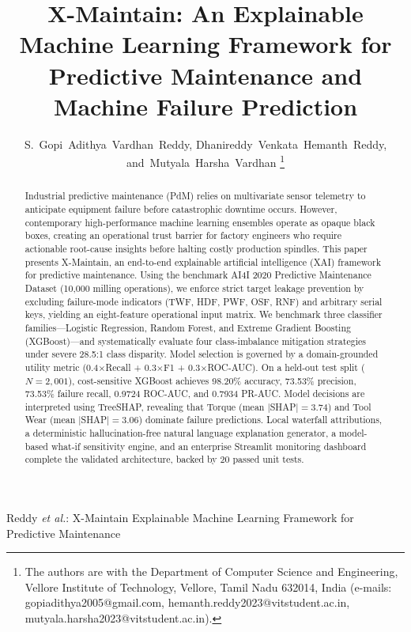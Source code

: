 \documentclass[journal,10pt,twocolumn]{IEEEtran}
\begin{document}
\title{X-Maintain: An Explainable Machine Learning Framework for Predictive Maintenance and Machine Failure Prediction}

\author{S.~Gopi~Adithya~Vardhan~Reddy,
        Dhanireddy~Venkata~Hemanth~Reddy,
        and~Mutyala~Harsha~Vardhan%
\thanks{The authors are with the Department of Computer Science and Engineering, Vellore Institute of Technology, Vellore, Tamil Nadu 632014, India (e-mails: gopiadithya2005@gmail.com, hemanth.reddy2023@vitstudent.ac.in, mutyala.harsha2023@vitstudent.ac.in).}}

%
{Reddy \MakeLowercase{\textit{et al.}}: X-Maintain Explainable Machine Learning Framework for Predictive Maintenance}

\maketitle

\begin{abstract}
Industrial predictive maintenance (PdM) relies on multivariate sensor telemetry to anticipate equipment failure before catastrophic downtime occurs. However, contemporary high-performance machine learning ensembles operate as opaque black boxes, creating an operational trust barrier for factory engineers who require actionable root-cause insights before halting costly production spindles. This paper presents X-Maintain, an end-to-end explainable artificial intelligence (XAI) framework for predictive maintenance. Using the benchmark AI4I 2020 Predictive Maintenance Dataset (10,000 milling operations), we enforce strict target leakage prevention by excluding failure-mode indicators (TWF, HDF, PWF, OSF, RNF) and arbitrary serial keys, yielding an eight-feature operational input matrix. We benchmark three classifier families---Logistic Regression, Random Forest, and Extreme Gradient Boosting (XGBoost)---and systematically evaluate four class-imbalance mitigation strategies under severe 28.5:1 class disparity. Model selection is governed by a domain-grounded utility metric (0.4$\times$Recall + 0.3$\times$F1 + 0.3$\times$ROC-AUC). On a held-out test split ($N = 2,001$), cost-sensitive XGBoost achieves 98.20\% accuracy, 73.53\% precision, 73.53\% failure recall, 0.9724 ROC-AUC, and 0.7934 PR-AUC. Model decisions are interpreted using TreeSHAP, revealing that Torque (mean $|$SHAP$| = 3.74$) and Tool Wear (mean $|$SHAP$| = 3.06$) dominate failure predictions. Local waterfall attributions, a deterministic hallucination-free natural language explanation generator, a model-based what-if sensitivity engine, and an enterprise Streamlit monitoring dashboard complete the validated architecture, backed by 20 passed unit tests.
\end{abstract}
\end{document}
